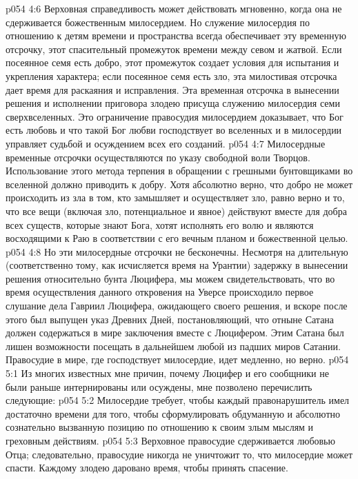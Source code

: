 \vs p054 4:6 Верховная справедливость может действовать мгновенно, когда она не сдерживается божественным милосердием. Но служение милосердия по отношению к детям времени и пространства всегда обеспечивает эту временную отсрочку, этот спасительный промежуток времени между севом и жатвой. Если посеянное семя есть добро, этот промежуток создает условия для испытания и укрепления характера; если посеянное семя есть зло, эта милостивая отсрочка дает время для раскаяния и исправления. Эта временная отсрочка в вынесении решения и исполнении приговора злодею присуща служению милосердия семи сверхвселенных. Это ограничение правосудия милосердием доказывает, что Бог есть любовь и что такой Бог любви господствует во вселенных и в милосердии управляет судьбой и осуждением всех его созданий.
\vs p054 4:7 Милосердные временные отсрочки осуществляются по указу свободной воли Творцов. Использование этого метода терпения в обращении с грешными бунтовщиками во вселенной должно приводить к добру. Хотя абсолютно верно, что добро не может происходить из зла в том, кто замышляет и осуществляет зло, равно верно и то, что все вещи (включая зло, потенциальное и явное) действуют вместе для добра всех существ, которые знают Бога, хотят исполнять его волю и являются восходящими к Раю в соответствии с его вечным планом и божественной целью.
\vs p054 4:8 Но эти милосердные отсрочки не бесконечны. Несмотря на длительную (соответственно тому, как исчисляется время на Урантии) задержку в вынесении решения относительно бунта Люцифера, мы можем свидетельствовать, что во время осуществления данного откровения на Уверсе происходило первое слушание дела Гавриил  Люцифера, ожидающего своего решения, и вскоре после этого был выпущен указ Древних Дней, постановляющий, что отныне Сатана должен содержаться в мире заключения вместе с Люцифером. Этим Сатана был лишен возможности посещать в дальнейшем любой из падших миров Сатании. Правосудие в мире, где господствует милосердие, идет медленно, но верно.
\vs p054 5:1 Из многих известных мне причин, почему Люцифер и его сообщники не были раньше интернированы или осуждены, мне позволено перечислить следующие:
\vs p054 5:2 \bibnobreakspace Милосердие требует, чтобы каждый правонарушитель имел достаточно времени для того, чтобы сформулировать обдуманную и абсолютно сознательно вызванную позицию по отношению к своим злым мыслям и греховным действиям.
\vs p054 5:3 \bibnobreakspace Верховное правосудие сдерживается любовью Отца; следовательно, правосудие никогда не уничтожит то, что милосердие может спасти. Каждому злодею даровано время, чтобы принять спасение.

